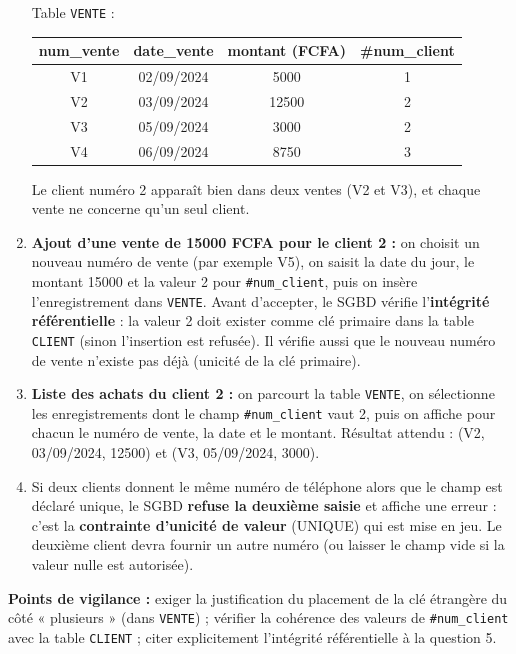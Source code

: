 \documentclass[11pt]{article}
\begin{document}
\begin{corrige}
\begin{enumerate}
Table \texttt{VENTE} :
\begin{center}
\begin{tabular}{|c|c|c|c|}
\hline
\rowcolor{popblueL} \textbf{num\_vente} & \textbf{date\_vente} & \textbf{montant (FCFA)} & \textbf{\#num\_client} \\
\hline
V1 & 02/09/2024 & \num{5000} & 1 \\
\hline
V2 & 03/09/2024 & \num{12500} & 2 \\
\hline
V3 & 05/09/2024 & \num{3000} & 2 \\
\hline
V4 & 06/09/2024 & \num{8750} & 3 \\
\hline
\end{tabular}
\end{center}
Le client numéro 2 apparaît bien dans deux ventes (V2 et V3), et chaque vente ne concerne qu'un seul client.
\item \textbf{Ajout d'une vente de \num{15000} FCFA pour le client 2 :} on choisit un nouveau numéro de vente (par exemple V5), on saisit la date du jour, le montant \num{15000} et la valeur 2 pour \texttt{\#num\_client}, puis on insère l'enregistrement dans \texttt{VENTE}. Avant d'accepter, le SGBD vérifie l'\textbf{intégrité référentielle} : la valeur 2 doit exister comme clé primaire dans la table \texttt{CLIENT} (sinon l'insertion est refusée). Il vérifie aussi que le nouveau numéro de vente n'existe pas déjà (unicité de la clé primaire).
\item \textbf{Liste des achats du client 2 :} on parcourt la table \texttt{VENTE}, on sélectionne les enregistrements dont le champ \texttt{\#num\_client} vaut 2, puis on affiche pour chacun le numéro de vente, la date et le montant. Résultat attendu : (V2, 03/09/2024, \num{12500}) et (V3, 05/09/2024, \num{3000}).
\item Si deux clients donnent le même numéro de téléphone alors que le champ est déclaré unique, le SGBD \textbf{refuse la deuxième saisie} et affiche une erreur : c'est la \textbf{contrainte d'unicité de valeur} (UNIQUE) qui est mise en jeu. Le deuxième client devra fournir un autre numéro (ou laisser le champ vide si la valeur nulle est autorisée).
\end{enumerate}

\textbf{Points de vigilance :} exiger la justification du placement de la clé étrangère du côté « plusieurs » (dans \texttt{VENTE}) ; vérifier la cohérence des valeurs de \texttt{\#num\_client} avec la table \texttt{CLIENT} ; citer explicitement l'intégrité référentielle à la question 5.
\end{corrige}
\end{document}
